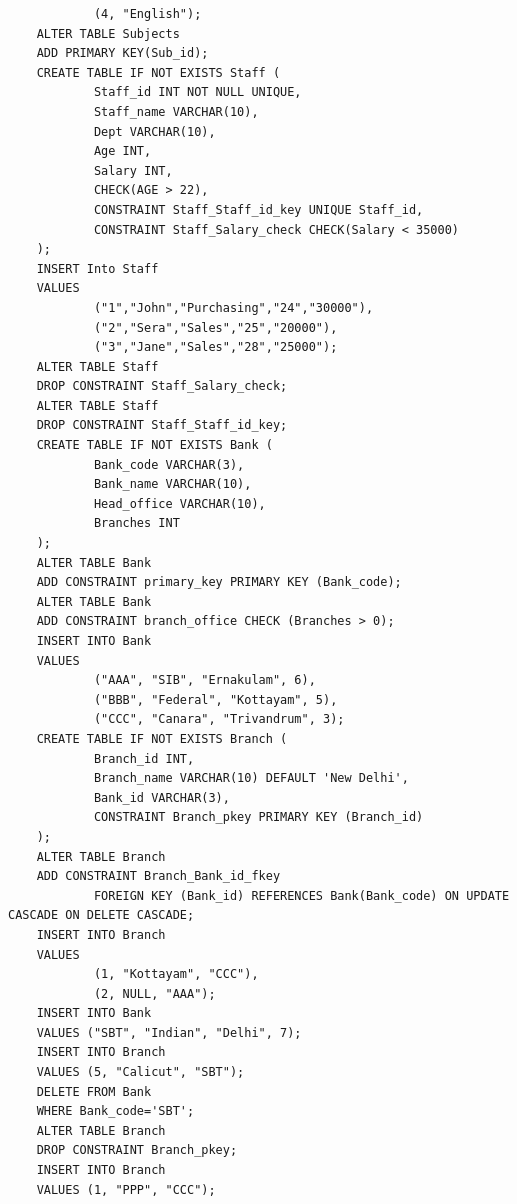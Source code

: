 \documentclass[13pt,oneside]{book}
\begin{document}
\begin{Itemize}
\begin{verbatim}
			(4, "English");
	ALTER TABLE Subjects
	ADD PRIMARY KEY(Sub_id);
	CREATE TABLE IF NOT EXISTS Staff (
			Staff_id INT NOT NULL UNIQUE,
			Staff_name VARCHAR(10),
			Dept VARCHAR(10),
			Age INT,
			Salary INT,
			CHECK(AGE > 22), 
			CONSTRAINT Staff_Staff_id_key UNIQUE Staff_id,
			CONSTRAINT Staff_Salary_check CHECK(Salary < 35000)
	);
	INSERT Into Staff
	VALUES
			("1","John","Purchasing","24","30000"),
			("2","Sera","Sales","25","20000"),
			("3","Jane","Sales","28","25000");
	ALTER TABLE Staff
	DROP CONSTRAINT Staff_Salary_check;
	ALTER TABLE Staff
	DROP CONSTRAINT Staff_Staff_id_key;
	CREATE TABLE IF NOT EXISTS Bank (
			Bank_code VARCHAR(3),
			Bank_name VARCHAR(10),
			Head_office VARCHAR(10),
			Branches INT
	);
	ALTER TABLE Bank
	ADD CONSTRAINT primary_key PRIMARY KEY (Bank_code);
	ALTER TABLE Bank
	ADD CONSTRAINT branch_office CHECK (Branches > 0);
	INSERT INTO Bank
	VALUES
			("AAA", "SIB", "Ernakulam", 6),
			("BBB", "Federal", "Kottayam", 5),
			("CCC", "Canara", "Trivandrum", 3);
	CREATE TABLE IF NOT EXISTS Branch (
			Branch_id INT,
			Branch_name VARCHAR(10) DEFAULT 'New Delhi',
			Bank_id VARCHAR(3),
			CONSTRAINT Branch_pkey PRIMARY KEY (Branch_id) 
	);
	ALTER TABLE Branch
	ADD CONSTRAINT Branch_Bank_id_fkey 
			FOREIGN KEY (Bank_id) REFERENCES Bank(Bank_code) ON UPDATE CASCADE ON DELETE CASCADE;
	INSERT INTO Branch
	VALUES
			(1, "Kottayam", "CCC"),
			(2, NULL, "AAA");
	INSERT INTO Bank
	VALUES ("SBT", "Indian", "Delhi", 7);
	INSERT INTO Branch
	VALUES (5, "Calicut", "SBT");
	DELETE FROM Bank
	WHERE Bank_code='SBT';
	ALTER TABLE Branch
	DROP CONSTRAINT Branch_pkey;
	INSERT INTO Branch
	VALUES (1, "PPP", "CCC");
	

\end{verbatim}
\end{Itemize}
\end{document}
